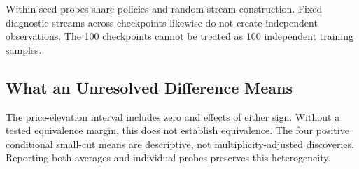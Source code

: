 Within-seed probes share policies and random-stream construction. Fixed diagnostic streams across checkpoints likewise do not create independent observations. The 100 checkpoints cannot be treated as 100 independent training samples.

\subsection{What an Unresolved Difference Means}

The price-elevation interval includes zero and effects of either sign. Without a tested equivalence margin, this does not establish equivalence. The four positive conditional small-cut means are descriptive, not multiplicity-adjusted discoveries. Reporting both averages and individual probes preserves this heterogeneity.

